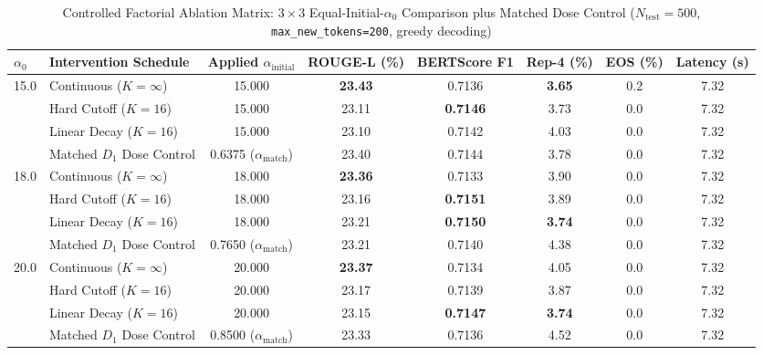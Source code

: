 \documentclass[conference]{IEEEtran}
\begin{document}
\begin{table}[t]
\centering
\caption{Controlled Factorial Ablation Matrix: $3\times 3$ Equal-Initial-$\alpha_0$ Comparison plus Matched Dose Control ($N_{\text{test}}=500$, \texttt{max\_new\_tokens=200}, greedy decoding)}
\label{tab:equal_alpha_ablation}
\begin{tabular}{llcccccc}
\hline
\textbf{$\alpha_0$} & \textbf{Intervention Schedule} & \textbf{Applied $\alpha_{\text{initial}}$} & \textbf{ROUGE-L (\%)} & \textbf{BERTScore F1} & \textbf{Rep-4 (\%)} & \textbf{EOS (\%)} & \textbf{Latency (s)} \\
\hline
\multirow{4}{*}{15.0}
 & Continuous ($K{=}\infty$) & 15.000 & \textbf{23.43} & 0.7136 & \textbf{3.65} & 0.2 & 7.32 \\
 & Hard Cutoff ($K{=}16$) & 15.000 & 23.11 & \textbf{0.7146} & 3.73 & 0.0 & 7.32 \\
 & Linear Decay ($K{=}16$) & 15.000 & 23.10 & 0.7142 & 4.03 & 0.0 & 7.32 \\
 & Matched $D_1$ Dose Control & 0.6375 ($\alpha_{\text{match}}$) & 23.40 & 0.7144 & 3.78 & 0.0 & 7.32 \\
\hline
\multirow{4}{*}{18.0}
 & Continuous ($K{=}\infty$) & 18.000 & \textbf{23.36} & 0.7133 & 3.90 & 0.0 & 7.32 \\
 & Hard Cutoff ($K{=}16$) & 18.000 & 23.16 & \textbf{0.7151} & 3.89 & 0.0 & 7.32 \\
 & Linear Decay ($K{=}16$) & 18.000 & 23.21 & \textbf{0.7150} & \textbf{3.74} & 0.0 & 7.32 \\
 & Matched $D_1$ Dose Control & 0.7650 ($\alpha_{\text{match}}$) & 23.21 & 0.7140 & 4.38 & 0.0 & 7.32 \\
\hline
\multirow{4}{*}{20.0}
 & Continuous ($K{=}\infty$) & 20.000 & \textbf{23.37} & 0.7134 & 4.05 & 0.0 & 7.32 \\
 & Hard Cutoff ($K{=}16$) & 20.000 & 23.17 & 0.7139 & 3.87 & 0.0 & 7.32 \\
 & Linear Decay ($K{=}16$) & 20.000 & 23.15 & \textbf{0.7147} & \textbf{3.74} & 0.0 & 7.32 \\
 & Matched $D_1$ Dose Control & 0.8500 ($\alpha_{\text{match}}$) & 23.33 & 0.7136 & 4.52 & 0.0 & 7.32 \\
\hline
\end{tabular}
\end{table}
\end{document}
